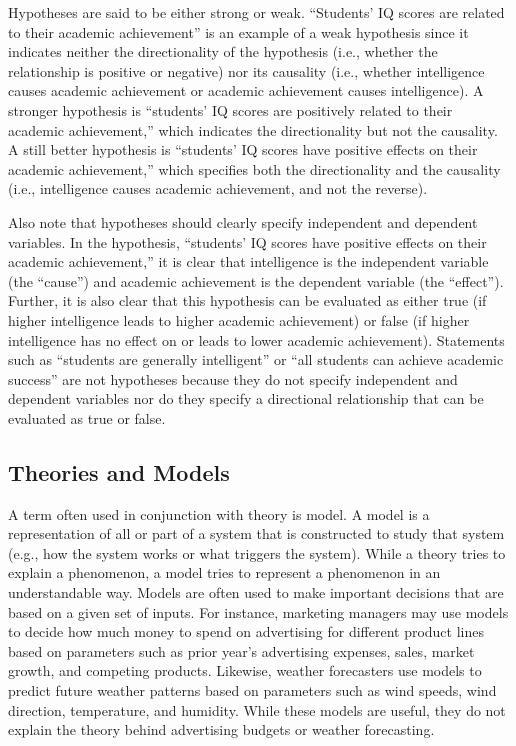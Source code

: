 Hypotheses are said to be either strong or weak. ``Students' IQ scores are related to their academic achievement'' is an example of a weak hypothesis since it indicates neither the directionality of the hypothesis (i.e., whether the relationship is positive or negative) nor its causality (i.e., whether intelligence causes academic achievement or academic achievement causes intelligence). A stronger hypothesis is ``students' IQ scores are positively related to their academic achievement,'' which indicates the directionality but not the causality. A still better hypothesis is ``students' IQ scores have positive effects on their academic achievement,'' which specifies both the directionality and the causality (i.e., intelligence causes academic achievement, and not the reverse).

Also note that hypotheses should clearly specify independent and dependent variables. In the hypothesis, ``students' IQ scores have positive effects on their academic achievement,'' it is clear that intelligence is the independent variable (the ``cause'') and academic achievement is the dependent variable (the ``effect''). Further, it is also clear that this hypothesis can be evaluated as either true (if higher intelligence leads to higher academic achievement) or false (if higher intelligence has no effect on or leads to lower academic achievement). Statements such as ``students are generally intelligent'' or ``all students can achieve academic success'' are not hypotheses because they do not specify independent and dependent variables nor do they specify a directional relationship that can be evaluated as true or false.

\subsection{Theories and Models}

A term often used in conjunction with theory is \gls{model}. A model is a representation of all or part of a system that is constructed to study that system (e.g., how the system works or what triggers the system). While a theory tries to explain a phenomenon, a model tries to represent a phenomenon in an understandable way. Models are often used to make important decisions that are based on a given set of inputs. For instance, marketing managers may use models to decide how much money to spend on advertising for different product lines based on parameters such as prior year's advertising expenses, sales, market growth, and competing products. Likewise, weather forecasters use models to predict future weather patterns based on parameters such as wind speeds, wind direction, temperature, and humidity. While these models are useful, they do not explain the theory behind advertising budgets or weather forecasting. 

